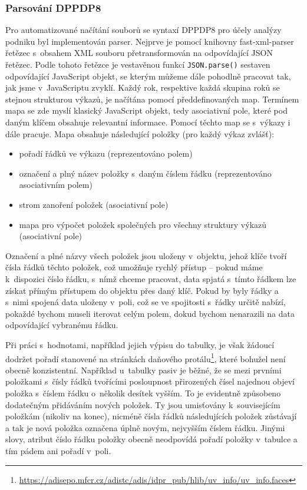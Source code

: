 \subsubsection{Parsování DPPDP8}
Pro automatizované načítání souborů se syntaxí DPPDP8 pro účely analýzy podniku byl implementován parser. Nejprve je pomocí knihovny fast-xml-parser řetězec s~obsahem XML souboru přetransformován na odpovídající JSON řetězec. Podle tohoto řetězce je vestavěnou funkcí \texttt{JSON.parse()} sestaven odpovídající JavaScript objekt, se kterým můžeme dále pohodlně pracovat tak, jak jsme v~JavaScriptu zvyklí. Každý rok, respektive každá skupina roků se stejnou strukturou výkazů, je načítána pomocí předdefinovaných map. Termínem mapa se zde myslí klasický JavaScript objekt, tedy asociativní pole, které pod daným klíčem obsahuje relevantní informace. Pomocí těchto map se s~výkazy i dále pracuje. Mapa obsahuje následující položky (pro každý výkaz zvlášť):

\begin{itemize}
\item pořadí řádků ve výkazu (reprezentováno polem)
\item označení a plný název položky s~daným číslem řádku (reprezentováno asociativním polem)
\item strom zanoření položek (asociativní pole)
\item mapa pro výpočet položek společných pro všechny struktury výkazů (asociativní pole)
\end{itemize} 

Označení a plné názvy všech položek jsou uloženy v~objektu, jehož klíče tvoří čísla řádků těchto položek, což umožňuje rychlý přístup -- pokud máme k~dispozici číslo řádku, s~nímž chceme pracovat, data spjatá s~tímto řádkem lze získat přímým přístupem do objektu přes daný klíč. Pokud by byly řádky a s~nimi spojená data uloženy v~poli, což se ve spojitosti s~řádky určitě nabízí, pokaždé bychom museli iterovat celým polem, dokud bychom nenarazili na data odpovídající vybranému řádku.

Při práci s~hodnotami, například jejich výpisu do tabulky, je však žádoucí dodržet pořadí stanovené na stránkách daňového protálu\footnote{\url{https://adisepo.mfcr.cz/adistc/adis/idpr_pub/hlib/uv_info/uv_info.faces}}, které bohužel není obecně konzistentní. Například u~tabulky pasiv je běžné, že se mezi prvními položkami s~čísly řádků tvořícími posloupnost přirozených čísel najednou objeví položka s~číslem řádku o~několik desítek vyšším. To je evidentně způsobeno dodatečným přidáváním nových položek. Ty jsou umisťovány k~souvisejícím položkám (nikoliv na konec), nicméně čísla řádků následujících položek zůstávají a tak je nová položka označena úplně novým, nejvyšším číslem řádku. Jinými slovy, atribut číslo řádku položky obecně neodpovídá pořadí položky v~tabulce a tím pádem ani pořadí v~poli.

